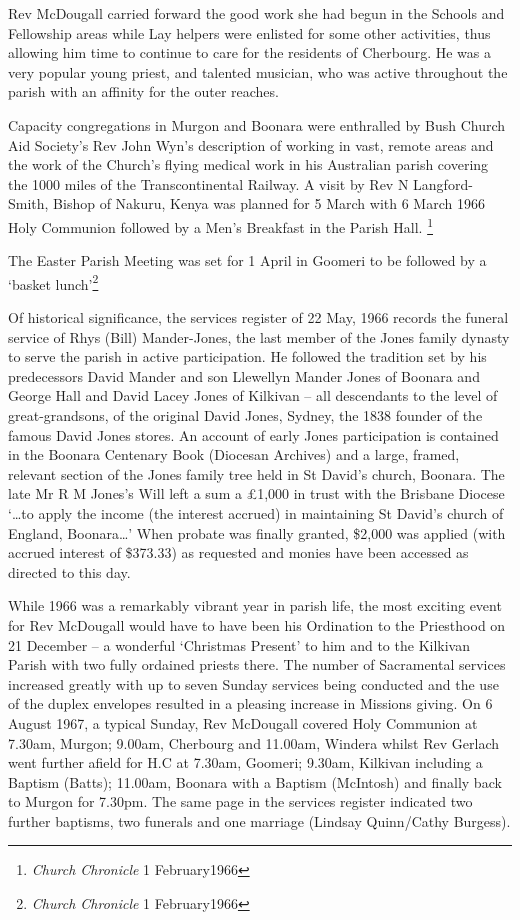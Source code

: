 Rev McDougall carried forward the good work she had begun in the Schools and Fellowship areas while Lay helpers were enlisted for some other activities, thus allowing him time to continue to care for the residents of Cherbourg. He was a very popular young priest, and talented musician, who was active throughout the parish with an affinity for the outer reaches.

Capacity congregations in Murgon and Boonara were enthralled by Bush Church Aid Society's Rev John Wyn's description of working in vast, remote areas and the work of the Church's flying medical work in his Australian parish covering the 1000 miles of the Transcontinental Railway. A visit by Rev N Langford-Smith, Bishop of Nakuru, Kenya was planned for 5 March with 6 March 1966 Holy Communion followed by a Men's Breakfast in the Parish Hall. \footnote{\emph{Church Chronicle} 1 February1966}

The Easter Parish Meeting was set for 1 April in Goomeri to be followed by a `basket lunch'\footnote{\emph{Church Chronicle} 1 February1966}

Of historical significance, the services register of 22 May, 1966 records the funeral service of Rhys (Bill) Mander-Jones, the last member of the Jones family dynasty to serve the parish in active participation. He followed the tradition set by his predecessors David Mander and son Llewellyn Mander Jones of Boonara and George Hall and David Lacey Jones of Kilkivan -- all descendants to the level of great-grandsons, of the original David Jones, Sydney, the 1838 founder of the famous David Jones stores. An account of early Jones participation is contained in the Boonara Centenary Book (Diocesan Archives) and a large, framed, relevant section of the Jones family tree held in St David's church, Boonara. The late Mr R M Jones's Will left a sum a £1,000 in trust with the Brisbane Diocese `\ldots to apply the income (the interest accrued) in maintaining St David's church of England, Boonara\ldots' When probate was finally granted, \$2,000 was applied (with accrued interest of \$373.33) as requested and monies have been accessed as directed to this day.

While 1966 was a remarkably vibrant year in parish life, the most exciting event for Rev McDougall would have to have been his Ordination to the Priesthood on 21 December -- a wonderful `Christmas Present' to him and to the Kilkivan Parish with two fully ordained priests there. The number of Sacramental services increased greatly with up to seven Sunday services being conducted and the use of the duplex envelopes resulted in a pleasing increase in Missions giving. On 6 August 1967, a typical Sunday, Rev McDougall covered Holy Communion at 7.30am, Murgon; 9.00am, Cherbourg and 11.00am, Windera whilst Rev Gerlach went further afield for H.C at 7.30am, Goomeri; 9.30am, Kilkivan including a Baptism (Batts); 11.00am, Boonara with a Baptism (McIntosh) and finally back to Murgon for 7.30pm. The same page in the services register indicated two further baptisms, two funerals and one marriage (Lindsay Quinn/Cathy Burgess).

